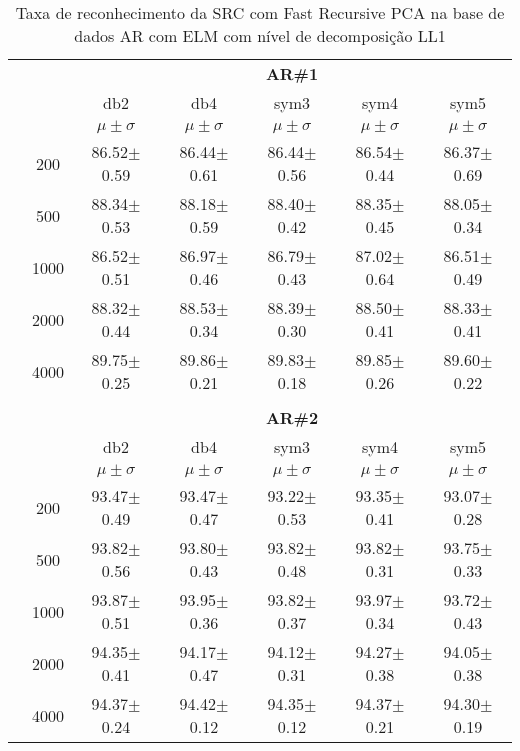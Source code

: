 \begin{table}[H]
	\centering
    \normalsize
	\caption{Taxa de reconhecimento da SRC com Fast Recursive PCA na base de dados AR com ELM com nível de decomposição LL1}
		\begin{tabular}{|c|c|c c c c c|}
\cline{3-7}
\multicolumn{2}{c|}{\multirow{3}{*}{}} & \multicolumn{5}{c|}{\textbf{AR\#1}}   \\\cline{3-7} 
\multicolumn{2}{c|}{}  & db2 & db4 & sym3 & sym4 & sym5 \\\cline{3-7}%
\multicolumn{2}{c|}{}& $\mu \pm \sigma$ & $\mu \pm \sigma$ & $\mu \pm \sigma$ & $\mu \pm \sigma$ & $\mu \pm \sigma$ \\\hline


\multicolumn{1}{|c|}{ \multirow{5}{*}{\rotatebox[origin=c]{90}{\textbf{Neurônios}}} }
&200	&86.52$\pm$0.59	&86.44$\pm$0.61	&86.44$\pm$0.56	&86.54$\pm$0.44	&86.37$\pm$0.69\\\cline{2-7}
&500	&88.34$\pm$0.53	&88.18$\pm$0.59	&88.40$\pm$0.42	&88.35$\pm$0.45	&88.05$\pm$0.34\\\cline{2-7}
&1000	&86.52$\pm$0.51	&86.97$\pm$0.46	&86.79$\pm$0.43	&87.02$\pm$0.64	&86.51$\pm$0.49\\\cline{2-7}
&2000	&88.32$\pm$0.44	&88.53$\pm$0.34	&88.39$\pm$0.30	&88.50$\pm$0.41	&88.33$\pm$0.41\\\cline{2-7}
&4000	&89.75$\pm$0.25	&89.86$\pm$0.21	&89.83$\pm$0.18	&89.85$\pm$0.26	&89.60$\pm$0.22


\\ \midrule
\multicolumn{7}{c}{}\\ 


\cline{3-7}
\multicolumn{2}{c|}{\multirow{3}{*}{}} & \multicolumn{5}{c|}{\textbf{AR\#2}}   \\\cline{3-7} 
\multicolumn{2}{c|}{}  & db2 & db4 & sym3 & sym4 & sym5 \\\cline{3-7}%
\multicolumn{2}{c|}{}& $\mu \pm \sigma$ & $\mu \pm \sigma$ & $\mu \pm \sigma$ & $\mu \pm \sigma$ & $\mu \pm \sigma$ \\\hline

\multicolumn{1}{|c|}{ \multirow{5}{*}{\rotatebox[origin=c]{90}{\textbf{Neurônios}}} }
&200	&93.47$\pm$0.49	&93.47$\pm$0.47	&93.22$\pm$0.53	&93.35$\pm$0.41	&93.07$\pm$0.28\\\cline{2-7}
&500	&93.82$\pm$0.56	&93.80$\pm$0.43	&93.82$\pm$0.48	&93.82$\pm$0.31	&93.75$\pm$0.33\\\cline{2-7}
&1000	&93.87$\pm$0.51	&93.95$\pm$0.36	&93.82$\pm$0.37	&93.97$\pm$0.34	&93.72$\pm$0.43\\\cline{2-7}
&2000	&94.35$\pm$0.41	&94.17$\pm$0.47	&94.12$\pm$0.31	&94.27$\pm$0.38	&94.05$\pm$0.38\\\cline{2-7}
&4000	&94.37$\pm$0.24	&94.42$\pm$0.12	&94.35$\pm$0.12	&94.37$\pm$0.21	&94.30$\pm$0.19


\end{tabular}
\end{table}
